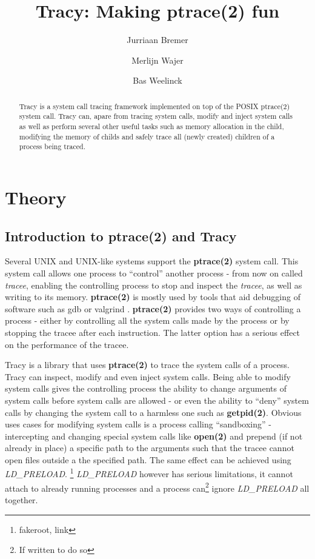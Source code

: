 \documentclass[a4paper, twoside, 10pt, twocolumn]{report}
\author{Jurriaan Bremer \and Merlijn Wajer \and Bas Weelinck}
\title{Tracy: Making ptrace(2) fun} %
\begin{document}
\maketitle

\begin{abstract}
    Tracy is a system call tracing framework implemented on top of the POSIX
    ptrace(2) system call.
    Tracy can, apare from tracing system calls, modify and inject system calls
    as well as perform several other useful tasks such as memory allocation in
    the child, modifying the memory of childs and safely trace all
    (newly created) children of a process being traced.
\end{abstract}

\tableofcontents


\chapter{Theory}

\section{Introduction to ptrace(2) and Tracy}

Several UNIX and UNIX-like systems support the \textbf{ptrace(2)} system call.
This system call allows one process to ``control'' another process - from now on
called \textit{tracee}, enabling the controlling process to stop and inspect
the \textit{tracee}, as well as writing to its memory. \textbf{ptrace(2)} is
mostly used by tools that aid debugging of software such as gdb\cite{} or
valgrind \cite{}. \textbf{ptrace(2)} provides two ways of controlling a process
- either by controlling all the system calls made by the process or by stopping
the tracee after each instruction. The latter option has a serious effect on the
performance of the tracee.

Tracy is a library that uses \textbf{ptrace(2)} to trace the system calls of a
process. Tracy can inspect, modify and even inject system calls. Being able to
modify system calls gives the controlling process the ability to change
arguments of system calls before system calls are allowed - or even the ability
to ``deny'' system calls by changing the system call to a harmless one such as
\textbf{getpid(2)}. Obvious uses cases for modifying system calls is a process
calling ``sandboxing'' - intercepting and changing special system calls like
\textbf{open(2)} and prepend (if not already in place) a specific path to the
arguments such that the tracee cannot open files outside a the specified path.
The same effect can be achieved using \textit{LD\_PRELOAD}. \footnote{fakeroot,
link} \textit{LD\_PRELOAD} however has serious limitations, it cannot attach to
already running processes and a process can\footnote{If written to do so} ignore
\textit{LD\_PRELOAD} all together.
\end{document}
